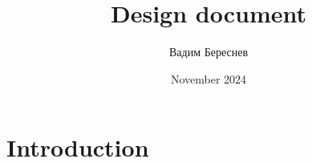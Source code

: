 \documentclass{article}
\title{Design document}
\author{Вадим Береснев}
\date{November 2024}
\begin{document}
\maketitle

\section{Introduction}
\end{document}
